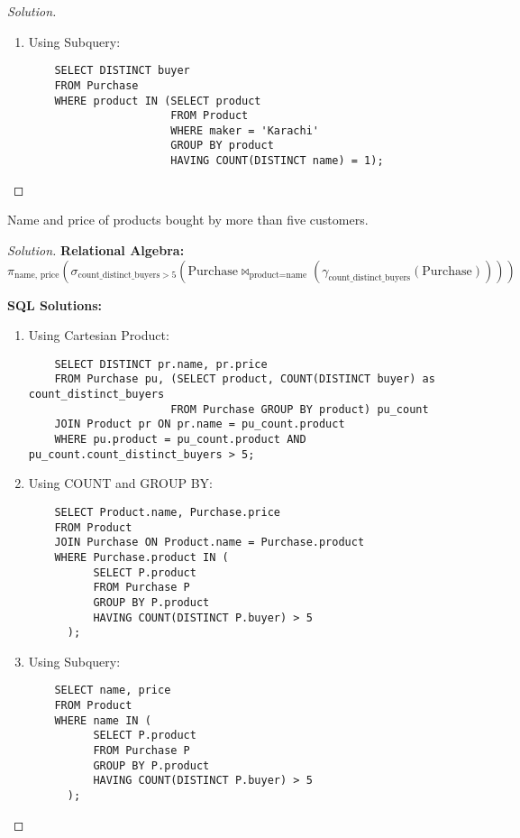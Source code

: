 \documentclass[10pt]{article}
\newenvironment{problem}[2][Problem]{\begin{trivlist}
\item[\hskip \labelsep {\bfseries #1}\hskip \labelsep {\bfseries #2.}]}{\end{trivlist}}
\begin{document}
\begin{proof}[Solution]
\begin{enumerate}
    \item Using Subquery:
    \begin{verbatim}
    SELECT DISTINCT buyer
    FROM Purchase
    WHERE product IN (SELECT product
                      FROM Product
                      WHERE maker = 'Karachi'
                      GROUP BY product
                      HAVING COUNT(DISTINCT name) = 1);
    \end{verbatim}
\end{enumerate}
\end{proof}


\begin{problem}{7}
Name and price of products bought by more than five customers.
\end{problem}

\begin{proof}[Solution]
\textbf{Relational Algebra:}
\[
\pi_{\text{name, price}}\left(\sigma_{\text{count\_distinct\_buyers} > 5}(\text{Purchase} \bowtie_{\text{product} = \text{name}} (\gamma_{\text{count\_distinct\_buyers}}(\text{Purchase})))
\right)
\]

\textbf{SQL Solutions:}
\begin{enumerate}
    \item Using Cartesian Product:
    \begin{verbatim}
    SELECT DISTINCT pr.name, pr.price
    FROM Purchase pu, (SELECT product, COUNT(DISTINCT buyer) as count_distinct_buyers
                      FROM Purchase GROUP BY product) pu_count
    JOIN Product pr ON pr.name = pu_count.product
    WHERE pu.product = pu_count.product AND pu_count.count_distinct_buyers > 5;
    \end{verbatim}

    \item Using COUNT and GROUP BY:
    \begin{verbatim}
    SELECT Product.name, Purchase.price
    FROM Product
    JOIN Purchase ON Product.name = Purchase.product
    WHERE Purchase.product IN (
          SELECT P.product
          FROM Purchase P
          GROUP BY P.product
          HAVING COUNT(DISTINCT P.buyer) > 5
      );
    \end{verbatim}
    
    \item Using Subquery:
    \begin{verbatim}
    SELECT name, price
    FROM Product
    WHERE name IN (
          SELECT P.product
          FROM Purchase P
          GROUP BY P.product
          HAVING COUNT(DISTINCT P.buyer) > 5
      );
    \end{verbatim}
    

\end{enumerate}
\end{proof}
\end{document}
